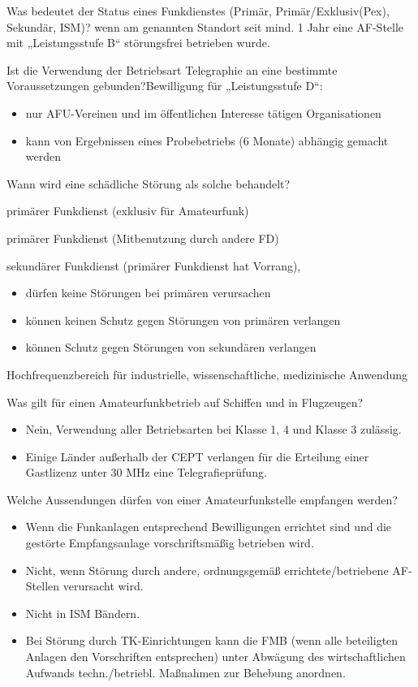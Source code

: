 \documentclass[avery5371,grid,frame,a4paper]{flashcards}
\newcommand{\card}[3]{
  \begin{flashcard}[{\chap} -- #1]{#2}#3\end{flashcard}
}
\begin{document}
\card{46}{Was bedeutet der Status eines Funkdienstes (Primär, Primär/Exklusiv(Pex), Sekundär, ISM)?}{ wenn am genannten Standort seit mind. 1 Jahr eine AF-Stelle mit „Leistungsstufe B“ störungsfrei betrieben wurde.}

\card{47}{Ist die Verwendung der Betriebsart Telegraphie an eine bestimmte Voraussetzungen gebunden?}{Bewilligung für „Leistungsstufe D“: \begin{itemize}\itemsep1pt \item nur AFU-Vereinen und im öffentlichen Interesse tätigen Organisationen \item kann von Ergebnissen eines Probebetriebs (6 Monate) abhängig gemacht werden\end{itemize}}

\card{48}{Wann wird eine schädliche Störung als solche behandelt?}{\small
  \begin{description}\itemsep0pt
    \item[Pex] primärer Funkdienst (exklusiv für Amateurfunk)
    \item[P] primärer Funkdienst (Mitbenutzung durch andere FD)
    \item[S] sekundärer Funkdienst (primärer Funkdienst hat Vorrang),
      \begin{itemize}[leftmargin=0pt,itemsep=0pt]
        \item dürfen keine Störungen bei primären verursachen
        \item können keinen Schutz gegen Störungen von primären verlangen
        \item können Schutz gegen Störungen von sekundären verlangen
      \end{itemize}
    \item[ISM] Hochfrequenzbereich für industrielle, wissenschaftliche, medizinische Anwendung
  \end{description}
}

\card{49}{Was gilt für einen Amateurfunkbetrieb auf Schiffen und in Flugzeugen?}{\begin{itemize}\itemsep1pt \item Nein, Verwendung aller Betriebsarten bei Klasse 1, 4 und Klasse 3 zulässig. \item Einige Länder außerhalb der CEPT verlangen für die Erteilung einer Gastlizenz
unter 30 MHz eine Telegrafieprüfung.\end{itemize}}

\card{50}{Welche Aussendungen dürfen von einer Amateurfunkstelle empfangen werden?}{\small{\begin{itemize}\itemsep0pt \item Wenn die Funkanlagen entsprechend Bewilligungen errichtet sind und die gestörte Empfangsanlage vorschriftsmäßig betrieben wird. \item Nicht, wenn Störung durch andere, ordnungsgemäß errichtete/betriebene AF-Stellen verursacht wird. \item Nicht in ISM Bändern. \item Bei Störung durch TK-Einrichtungen kann die FMB (wenn alle beteiligten Anlagen den Vorschriften entsprechen) unter Abwägung des wirtschaftlichen Aufwands techn./betriebl. Maßnahmen zur Behebung anordnen.\end{itemize}}}
\end{document}
